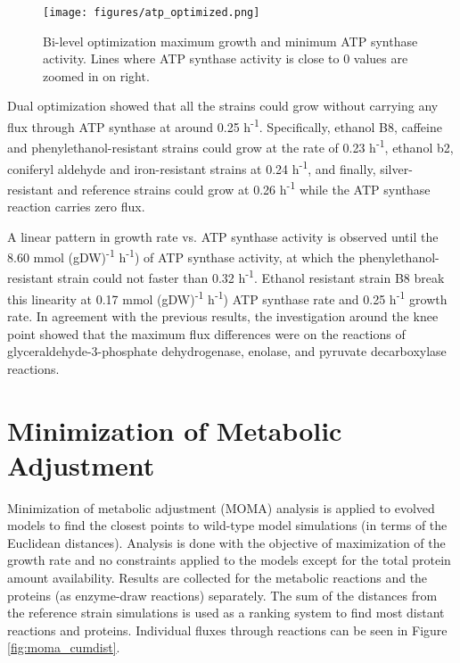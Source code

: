 \vspace{1cm}

\begin{figure}[H]
  \begin{center}
  \texttt{[image: figures/atp\_optimized.png]}
  \caption[Bi-level optimization maximum growth and minimum ATP synthase activity. Lines where ATP synthase activity is close to 0 values are zoomed in on right.]{Bi-level optimization maximum growth and minimum ATP synthase activity. Lines where ATP synthase activity is close to 0 values are zoomed in on right.}
  \label{fig:bi_level1}
  \end{center}
\end{figure}

Dual optimization showed that all the strains could grow without carrying any flux through ATP synthase at around 0.25 h\textsuperscript{-1}. Specifically, ethanol B8,
caffeine and phenylethanol-resistant strains could grow at the rate of  0.23 h\textsuperscript{-1}, ethanol b2, coniferyl aldehyde and iron-resistant strains at 0.24 h\textsuperscript{-1}, and finally, silver-resistant and reference strains could grow at  0.26 h\textsuperscript{-1} while the ATP synthase reaction carries zero flux.

A linear pattern in growth rate vs. ATP synthase activity is observed until the 8.60 mmol (gDW)\textsuperscript{-1} h\textsuperscript{-1}) of ATP synthase activity, at which the phenylethanol-resistant strain could not faster than 0.32 h\textsuperscript{-1}. Ethanol resistant strain B8 break this linearity at 0.17  mmol (gDW)\textsuperscript{-1} h\textsuperscript{-1}) ATP synthase rate and 0.25 h\textsuperscript{-1} growth rate. In agreement with the previous results, the investigation around the knee point showed that the maximum flux differences were on the reactions of glyceraldehyde-3-phosphate dehydrogenase, enolase, and pyruvate decarboxylase reactions.

\section{Minimization of Metabolic Adjustment}

Minimization of metabolic adjustment (MOMA) analysis is applied to evolved models to find the closest points to wild-type model simulations (in terms of the Euclidean distances). Analysis is done with the objective of maximization of the growth rate and no constraints applied to the models except for the total protein amount availability. Results are collected for the metabolic reactions and the proteins (as enzyme-draw reactions) separately. The sum of the distances from the reference strain simulations is used as a ranking system to find most distant reactions and proteins. Individual fluxes through reactions can be seen in Figure \ref{fig:moma_cumdist}.


